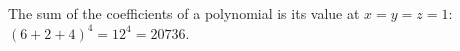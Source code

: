 The sum of the coefficients of a polynomial is its value at $x=y=z=1$: $(6+2+4)^4=12^4=\boxed{20736}$.
